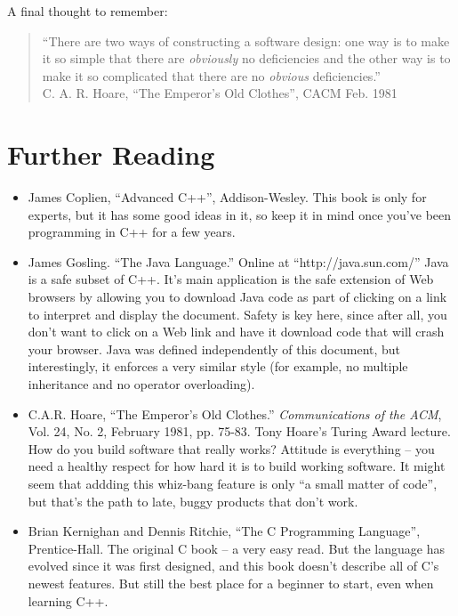A final thought to remember:

\begin{quote}
``There are two ways of constructing a software design: one way is to
make it so simple that there are {\em obviously} no deficiencies and
the other way is to make it so complicated that there are no {\em
obvious} deficiencies.'' \\ \hbox{} \hfill C. A. R. Hoare, ``The Emperor's
Old Clothes'', CACM Feb. 1981
\end{quote}

\section{Further Reading}

\begin{itemize}
\item[] James Coplien, ``Advanced C++'', Addison-Wesley.
This book is only for experts, but it has some good ideas in it,
so keep it in mind once you've been programming in C++ for a few years.

\item[] James Gosling.  ``The Java Language.''  Online at
``http://java.sun.com/''  Java is a safe subset of C++.  It's main 
application is the safe extension of Web browsers by allowing 
you to download Java code as part of clicking on a link to 
interpret and display the document.  Safety is key here, since 
after all, you don't want to click on a Web link and have 
it download code that will crash your browser.  Java was defined 
independently of this document, but interestingly, it enforces a 
very similar style (for example, no multiple inheritance and
no operator overloading).

\item[] C.A.R. Hoare, ``The Emperor's Old Clothes.''
{\em Communications of the ACM}, Vol. 24, No. 2, February 1981,
pp. 75-83.  Tony Hoare's Turing Award lecture.  How do you build 
software that really works?  Attitude is everything -- you need
a healthy respect for how hard it is to build working software. 
It might seem that addding this whiz-bang feature is only 
``a small matter of code'', but that's the path to late, buggy
products that don't work.

\item[] Brian Kernighan and Dennis Ritchie, ``The C Programming Language'',
Prentice-Hall.  The original C book -- a very easy read.  But the
language has evolved since it was first designed, and this book doesn't
describe all of C's newest features.  But still the best place for
a beginner to start, even when learning C++.


\end{itemize}
